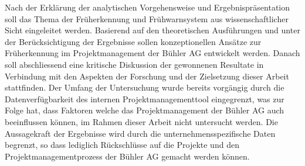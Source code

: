 \newline\newline
Nach der Erklärung der analytischen Vorgehensweise und Ergebnispräsentation soll das Thema der Früherkennung und Frühwarnsystem aus wissenschaftlicher Sicht eingeleitet werden. Basierend auf den theoretischen Ausführungen und unter der Berücksichtigung der Ergebnisse sollen konzeptionellen Ansätze zur Früherkennung im Projektmanagement der Bühler AG entwickelt werden. Danach soll abschliessend eine kritische Diskussion der gewonnenen Resultate in Verbindung mit den Aspekten der Forschung und der Zielsetzung dieser Arbeit stattfinden.
\newline\newline 
Der Umfang der Untersuchung wurde bereits vorgängig durch die Datenverfügbarkeit des internen Projektmanagementtool eingegrenzt, was zur Folge hat, dass Faktoren welche das Projektmanagement der Bühler AG auch beeinflussen können, im Rahmen dieser Arbeit nicht untersucht werden. Die Aussagekraft der Ergebnisse wird durch die unternehmensspezifische Daten begrenzt, so dass lediglich Rückschlüsse auf die Projekte und den Projektmanagementprozess der Bühler AG gemacht werden können.
